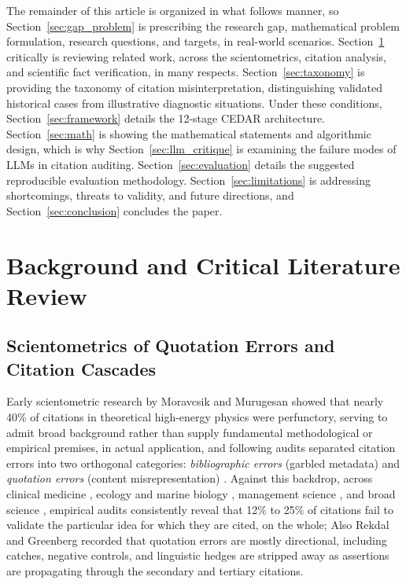 \documentclass[journal]{IEEEtran}
\begin{document}
The remainder of this article is organized in what follows manner, so Section~\ref{sec:gap_problem} is prescribing the research gap, mathematical problem formulation, research questions, and targets, in real-world scenarios. Section~\ref{sec:related} critically is reviewing related work, across the scientometrics, citation analysis, and scientific fact verification, in many respects. Section~\ref{sec:taxonomy} is providing the taxonomy of citation misinterpretation, distinguishing validated historical cases from illustrative diagnostic situations. Under these conditions, Section~\ref{sec:framework} details the 12-stage CEDAR architecture. Section~\ref{sec:math} is showing the mathematical statements and algorithmic design, which is why Section~\ref{sec:llm_critique} is examining the failure modes of LLMs in citation auditing. Section~\ref{sec:evaluation} details the suggested reproducible evaluation methodology. Section~\ref{sec:limitations} is addressing shortcomings, threats to validity, and future directions, and Section~\ref{sec:conclusion} concludes the paper.

\section{Background and Critical Literature Review}
\label{sec:related}

\subsection{Scientometrics of Quotation Errors and Citation Cascades}
Early scientometric research by Moravcsik and Murugesan \cite{moravcsik1975some} showed that nearly 40\% of citations in theoretical high-energy physics were perfunctory, serving to admit broad background rather than supply fundamental methodological or empirical premises, in actual application, and following audits separated citation errors into two orthogonal categories: \emph{bibliographic errors} (garbled metadata) and \emph{quotation errors} (content misrepresentation) \cite{delacey1985accurate,jergas2015quotation}. Against this backdrop, across clinical medicine \cite{delacey1985accurate,mogull2017accuracy,pavlovic2021accurate}, ecology and marine biology \cite{todd2010marine}, management science \cite{harzing2002referencing}, and broad science \cite{smith2020quotation}, empirical audits consistently reveal that 12\% to 25\% of citations fail to validate the particular idea for which they are cited, on the whole; Also Rekdal \cite{rekdal2014sinking,rekdal2014urban} and Greenberg \cite{greenberg2009citation} recorded that quotation errors are mostly directional, including catches, negative controls, and linguistic hedges \cite{hyland1998hedging} are stripped away as assertions are propagating through the secondary and tertiary citations.
\end{document}
